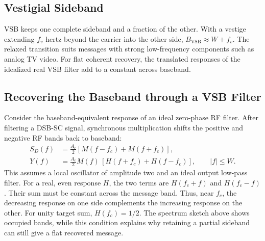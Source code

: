 \documentclass[12pt,a4paper]{article}
\begin{document}
\subsection{Vestigial Sideband}
VSB keeps one complete sideband and a fraction of the other. With a vestige extending $f_v$ hertz beyond the carrier into the other side, $B_{\mathrm{VSB}}\approx W+f_v$. The relaxed transition suits messages with strong low-frequency components such as analog TV video. For flat coherent recovery, the translated responses of the idealized real VSB filter add to a constant across baseband.

\begin{tcolorbox}[tikzbox, unbreakable, title={Positive-Frequency Occupancy of the Linear Modulation Schemes}]
\centering
{}\par
\end{tcolorbox}


\subsection{Recovering the Baseband through a VSB Filter}
Consider the baseband-equivalent response of an ideal zero-phase RF filter. After filtering a DSB-SC signal, synchronous multiplication shifts the positive and negative RF bands back to baseband:
\[
\begin{aligned}
 S_D(f)&=\tfrac{A_c}{2}[M(f-f_c)+M(f+f_c)],\\
 Y(f)&=\tfrac{A_c}{2}M(f)\,[H(f+f_c)+H(f-f_c)],
       \qquad |f|\le W .
\end{aligned}
\]
This assumes a local oscillator of amplitude two and an ideal output low-pass filter. For a real, even response $H$, the two terms are $H(f_c+f)$ and $H(f_c-f)$. Their sum must be constant across the message band. Thus, near $f_c$, the decreasing response on one side complements the increasing response on the other. For unity target sum, $H(f_c)=1/2$. The spectrum sketch above shows occupied bands, while this condition explains why retaining a partial sideband can still give a flat recovered message.
\end{document}
